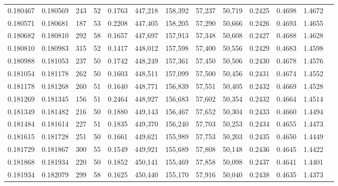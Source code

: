 \begin{tabular}{rrrrrrrrrrrrr}
0.180467 & 0.180569 &   243 &  52 &                                     0.1763 & 447,218 & 158,392 &  57,237 &  50,719 & 0.2425 & 0.4698 & 1.4672 \\
0.180571 & 0.180681 &   187 &  53 &                                     0.2208 & 447,405 & 158,205 &  57,290 &  50,666 & 0.2426 & 0.4693 & 1.4655 \\
0.180682 & 0.180810 &   292 &  58 &                                     0.1657 & 447,697 & 157,913 &  57,348 &  50,608 & 0.2427 & 0.4688 & 1.4628 \\
0.180810 & 0.180983 &   315 &  52 &                                     0.1417 & 448,012 & 157,598 &  57,400 &  50,556 & 0.2429 & 0.4683 & 1.4598 \\
0.180988 & 0.181053 &   237 &  50 &                                     0.1742 & 448,249 & 157,361 &  57,450 &  50,506 & 0.2430 & 0.4678 & 1.4576 \\
0.181054 & 0.181178 &   262 &  50 &                                     0.1603 & 448,511 & 157,099 &  57,500 &  50,456 & 0.2431 & 0.4674 & 1.4552 \\
0.181178 & 0.181268 &   260 &  51 &                                     0.1640 & 448,771 & 156,839 &  57,551 &  50,405 & 0.2432 & 0.4669 & 1.4528 \\
0.181269 & 0.181345 &   156 &  51 &                                     0.2464 & 448,927 & 156,683 &  57,602 &  50,354 & 0.2432 & 0.4664 & 1.4514 \\
0.181349 & 0.181482 &   216 &  50 &                                     0.1880 & 449,143 & 156,467 &  57,652 &  50,304 & 0.2433 & 0.4660 & 1.4494 \\
0.181484 & 0.181614 &   227 &  51 &                                     0.1835 & 449,370 & 156,240 &  57,703 &  50,253 & 0.2434 & 0.4655 & 1.4473 \\
0.181615 & 0.181728 &   251 &  50 &                                     0.1661 & 449,621 & 155,989 &  57,753 &  50,203 & 0.2435 & 0.4650 & 1.4449 \\
0.181729 & 0.181867 &   300 &  55 &                                     0.1549 & 449,921 & 155,689 &  57,808 &  50,148 & 0.2436 & 0.4645 & 1.4422 \\
0.181868 & 0.181934 &   220 &  50 &                                     0.1852 & 450,141 & 155,469 &  57,858 &  50,098 & 0.2437 & 0.4641 & 1.4401 \\
0.181934 & 0.182079 &   299 &  58 &                                     0.1625 & 450,440 & 155,170 &  57,916 &  50,040 & 0.2438 & 0.4635 & 1.4373 \\

\end{tabular}
